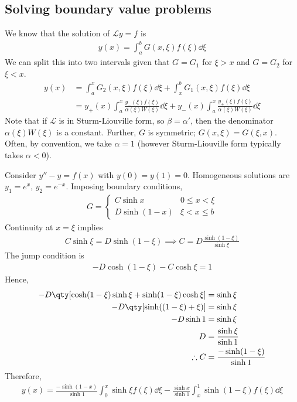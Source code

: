 \subsection{Solving boundary value problems}
We know that the solution of $\mathcal L y = f$ is
\begin{align*}
	y(x) = \int_a^b G(x,\xi) f(\xi) \dd{\xi}
\end{align*}
We can split this into two intervals given that $G = G_1$ for $\xi > x$ and $G = G_2$ for $\xi < x$.
\begin{align*}
	y(x) & = \int_a^x G_2(x,\xi) f(\xi) \dd{\xi} + \int_x^b G_1(x,\xi) f(\xi) \dd{\xi} \\
    & = y_+(x) \int_a^x \frac{y_-(\xi) f(\xi)}{\alpha(\xi)W(\xi)} \dd{\xi} + y_-(x) \int_a^x \frac{y_+(\xi) f(\xi)}{\alpha(\xi)W(\xi)} \dd{\xi}
\end{align*}
Note that if $\mathcal L$ is in Sturm-Liouville form, so $\beta = \alpha'$, then the denominator $\alpha(\xi)W(\xi)$ is a constant.
Further, $G$ is symmetric; $G(x,\xi) = G(\xi,x)$.
Often, by convention, we take $\alpha = 1$ (however Sturm-Liouville form typically takes $\alpha < 0$).
\begin{example}
	Consider $y'' - y = f(x)$ with $y(0) = y(1) = 0$.
	Homogeneous solutions are $y_1 = e^x$, $y_2 = e^{-x}$.
	Imposing boundary conditions,
	\begin{align*}
		G = \begin{cases}
			C \sinh x    & 0 \leq x < \xi \\
			D \sinh(1-x) & \xi < x \leq b
		\end{cases}
	\end{align*}
	Continuity at $x = \xi$ implies
	\begin{align*}
		C \sinh \xi = D \sinh (1 - \xi) \implies C = D \frac{\sinh (1-\xi)}{\sinh \xi}
	\end{align*}
	The jump condition is
	\begin{align*}
		-D \cosh(1-\xi) - C \cosh \xi = 1
	\end{align*}
	Hence,
	\begin{align*}
		-D\qty[\cosh(1-\xi)\sinh \xi + \sinh(1-\xi)\cosh \xi] & = \sinh \xi  \\
		-D\qty[\sinh((1-\xi) + \xi)] &= \sinh \xi \\
		-D\sinh 1 &= \sinh \xi \\
		D &= \frac{\sinh \xi}{\sinh 1} \\
		\therefore C &= \frac{-\sinh(1-\xi)}{\sinh 1}
	\end{align*}
	Therefore,
	\begin{align*}
		y(x) = \frac{-\sinh(1-x)}{\sinh 1} \int_0^x \sinh \xi f(\xi) \dd{\xi} - \frac{\sinh x}{\sinh 1} \int_x^1 \sinh (1-\xi) f(\xi) \dd{\xi}
	\end{align*}
\end{example}
